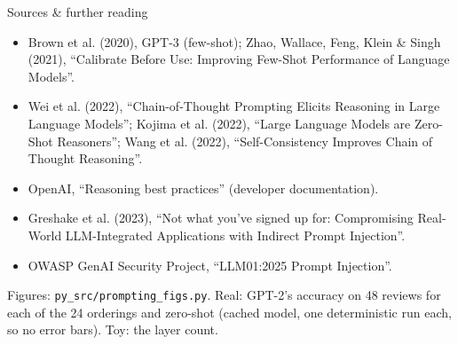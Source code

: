 \documentclass[aspectratio=169]{beamer}
\newcommand{\src}[1]{{\scriptsize\color{gray} #1}}
\begin{document}
\begin{frame}{Sources \& further reading}
  \footnotesize
  \begin{itemize}
    \item Brown et al. (2020), GPT-3 (few-shot); Zhao, Wallace, Feng, Klein \& Singh (2021),
      ``Calibrate Before Use: Improving Few-Shot Performance of Language Models''.
    \item Wei et al. (2022), ``Chain-of-Thought Prompting Elicits Reasoning in Large Language
      Models''; Kojima et al. (2022), ``Large Language Models are Zero-Shot Reasoners''; Wang et
      al. (2022), ``Self-Consistency Improves Chain of Thought Reasoning''.
    \item OpenAI, ``Reasoning best practices'' (developer documentation).
    \item Greshake et al. (2023), ``Not what you've signed up for: Compromising Real-World
      LLM-Integrated Applications with Indirect Prompt Injection''.
    \item OWASP GenAI Security Project, ``LLM01:2025 Prompt Injection''.
  \end{itemize}
  \vskip 2pt
  \src{Figures: \texttt{py\_src/prompting\_figs.py}. Real: GPT-2's accuracy on 48 reviews for each
  of the 24 orderings and zero-shot (cached model, one deterministic run each, so no error bars).
  Toy: the layer count.}
\end{frame}
\end{document}
